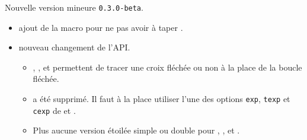 Nouvelle version mineure \verb+0.3.0-beta+.

\begin{itemize}[itemsep=.5em]
    \item {}
          ajout de la macro  pour ne pas avoir à taper .


    \item {} nouveau changement de l'API.
    \begin{itemize}[itemsep=.5em]
        \item {}, ,  et  permettent de tracer une croix fléchée ou non à la place de la boucle fléchée.

        \item {} a été supprimé. Il faut à la place utiliser l'une des options \verb#exp#, \verb#texp# et \verb#cexp# de  et .

        \item Plus aucune version étoilée simple ou double pour , ,  et .
    \end{itemize}


\end{itemize}

\separation

